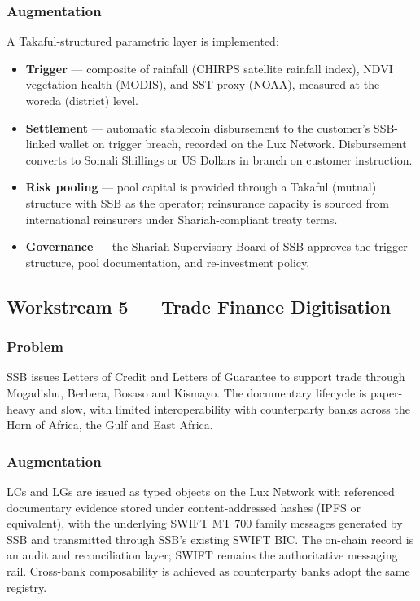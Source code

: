 \documentclass[11pt,letterpaper]{article}
\begin{document}
\subsubsection{Augmentation}
A Takaful-structured parametric layer is implemented:
\begin{itemize}[leftmargin=1.6em]
  \item \textbf{Trigger} --- composite of rainfall (CHIRPS satellite
        rainfall index), NDVI vegetation health (MODIS), and SST proxy
        (NOAA), measured at the woreda (district) level.
  \item \textbf{Settlement} --- automatic stablecoin disbursement to
        the customer's SSB-linked wallet on trigger breach, recorded
        on the Lux Network. Disbursement converts to Somali Shillings
        or US Dollars in branch on customer instruction.
  \item \textbf{Risk pooling} --- pool capital is provided through a
        Takaful (mutual) structure with SSB as the operator;
        reinsurance capacity is sourced from international reinsurers
        under Shariah-compliant treaty terms.
  \item \textbf{Governance} --- the Shariah Supervisory Board of SSB
        approves the trigger structure, pool documentation, and
        re-investment policy.
\end{itemize}

\subsection{Workstream 5 --- Trade Finance Digitisation}

\subsubsection{Problem}
SSB issues Letters of Credit and Letters of Guarantee to support
trade through Mogadishu, Berbera, Bosaso and Kismayo. The
documentary lifecycle is paper-heavy and slow, with limited
interoperability with counterparty banks across the Horn of Africa,
the Gulf and East Africa.

\subsubsection{Augmentation}
LCs and LGs are issued as typed objects on the Lux Network with
referenced documentary evidence stored under content-addressed hashes
(IPFS or equivalent), with the underlying SWIFT MT 700 family messages
generated by SSB and transmitted through SSB's existing SWIFT BIC.
The on-chain record is an audit and reconciliation layer; SWIFT
remains the authoritative messaging rail. Cross-bank composability is
achieved as counterparty banks adopt the same registry.
\end{document}
